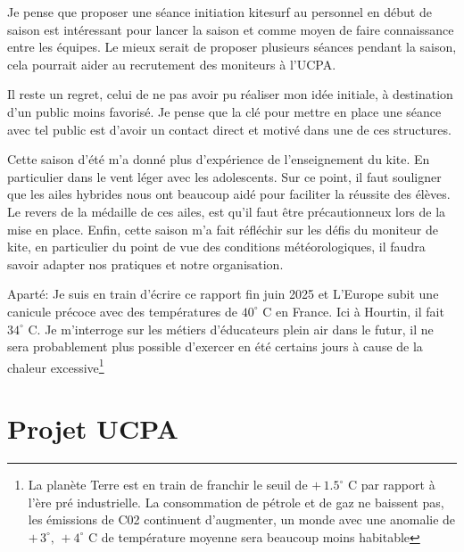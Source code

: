 \documentclass[11pt,a4paper]{report}
\begin{document}
Je pense que proposer une séance initiation kitesurf au 
personnel en début de saison est intéressant pour lancer la saison
et comme moyen de faire connaissance entre les équipes. Le mieux serait de proposer plusieurs séances pendant la saison, cela pourrait aider au recrutement 
des moniteurs à  l'UCPA.

Il reste un regret, celui de ne pas avoir pu réaliser mon idée initiale, 
à destination d'un public moins favorisé. 
Je pense que la clé pour
mettre en place une séance avec tel public est d'avoir un contact
direct et motivé dans une de ces structures.


Cette saison d'été m'a donné plus d'expérience  
de l'enseignement du kite. En particulier dans le vent léger avec les adolescents.
Sur ce point, il faut souligner que les ailes hybrides nous ont beaucoup aidé pour 
faciliter la réussite des élèves. Le revers de la médaille de ces ailes, est qu'il 
faut \^etre précautionneux lors de la mise en place.
Enfin, cette saison m'a fait réfléchir sur les défis du moniteur de kite, en 
particulier du point de vue des conditions météorologiques, il faudra savoir
adapter nos pratiques et notre organisation.

Aparté: Je suis en train d'écrire ce rapport fin juin 2025 et L’Europe subit
une canicule précoce avec des températures de $40^{\circ}$ C en France. Ici à Hourtin, 
il fait $34^{\circ}$ C.
Je m'interroge sur les métiers d'éducateurs plein air dans le futur, il ne sera
probablement plus possible d'exercer en été certains jours
à cause de la chaleur excessive\footnote{
La planète Terre est en train de franchir le seuil  de  $+\, 1.5^{\circ}$ C par rapport
 à l'ère pré industrielle. La consommation de pétrole et de gaz ne baissent pas, les 
émissions de C02 continuent d'augmenter\cite{giec}, un monde avec une anomalie de $+\, 3^{\circ},\, +4^{\circ}$ C  de température moyenne sera beaucoup moins habitable}

\appendix
\appendixpage
\addappheadtotoc

\chapter{\small{Projet UCPA}\label{ucpa_projet}}

\end{document}
